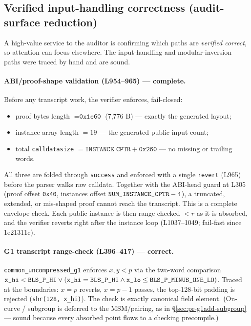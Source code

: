 \subsection{Verified input-handling correctness (audit-surface reduction)}
\label{sec:pr-input-verified}

A high-value service to the auditor is confirming which paths are
\emph{verified correct}, so attention can focus elsewhere. The
input-handling and modular-inversion paths were traced by hand and
are sound.

\paragraph{ABI/proof-shape validation (L954--965) --- complete.}
Before any transcript work, the verifier enforces, fail-closed:
\begin{itemize}[leftmargin=1.4em,itemsep=2pt]
\item proof bytes length $= \texttt{0x1e60}$ (7{,}776 B) ---
  exactly the generated layout;
\item instance-array length $= 19$ --- the generated public-input
  count;
\item total \texttt{calldatasize} $= \texttt{INSTANCE\_CPTR} +
  \texttt{0x260}$ --- no missing or trailing words.
\end{itemize}
All three are folded through \texttt{success} and enforced with a
single \texttt{revert} (L965) before the parser walks raw calldata.
Together with the ABI-head guard at L305 (proof offset
\texttt{0x40}, instances offset $\texttt{NUM\_\allowbreak{}INSTANCE\_\allowbreak{}CPTR}-4$), a
truncated, extended, or mis-shaped proof cannot reach the
transcript. This is a complete envelope check. Each public instance
is then range-checked $< r$ as it is absorbed, and the verifier
reverts right after the instance loop (L1037--1049; fail-fast since
1e21311c).

\paragraph{G1 transcript range-check (L396--417) --- correct.}
\texttt{common\_\allowbreak{}uncompressed\_\allowbreak{}g1} enforces $x, y < p$ via the
two-word comparison
$\texttt{x\_hi} < \texttt{BLS\_P\_HI} \lor (\texttt{x\_hi} =
\texttt{BLS\_P\_HI} \land \texttt{x\_lo} \le
\texttt{BLS\_\allowbreak{}P\_\allowbreak{}MINUS\_\allowbreak{}ONE\_\allowbreak{}LO})$. Traced at the boundaries:
$x = p$ reverts, $x = p-1$ passes, the top-128-bit padding is
rejected (\texttt{shr(128, x\_hi)}). The check is exactly
$\text{canonical field element}$. (On-curve / subgroup is
deferred to the MSM/pairing, as in \S\ref{sec:pr-g1add-subgroup}
--- sound because every absorbed point flows to a checking
precompile.)

